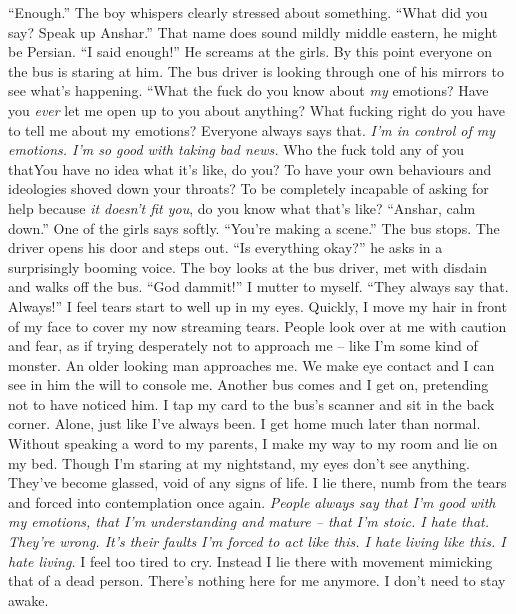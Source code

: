 \documentclass[a4paper, 12pt]{book}
\newcommand\tab[1][1cm]{\hspace*{#1}}
\begin{document}
\newline
\tab
``Enough.'' The boy whispers clearly stressed about something.
\newline
\tab
``What did you say? Speak up Anshar.'' That name does sound mildly middle eastern, he might be Persian.
\newline
\tab
``I said enough!'' He screams at the girls. By this point everyone on the bus is staring at him. The bus driver is looking through one of his mirrors to see what’s happening. ``What the fuck do you know about \textit{my} emotions? Have you \textit{ever} let me open up to you about anything? What fucking right do you have to tell me about my emotions? Everyone always says that. \textit{I’m in control of my emotions. I’m so good with taking bad news.} Who the fuck told any of you that\textinterrobang You have no idea what it’s like, do you? To have your own behaviours and ideologies shoved down your throats? To be completely incapable of asking for help because \textit{it doesn’t fit you}, do you know what that’s like?
\newline
\tab
``Anshar, calm down.'' One of the girls says softly. ``You’re making a scene.''
\newline
\tab
The bus stops. The driver opens his door and steps out. ``Is everything okay?'' he asks in a surprisingly booming voice. The boy looks at the bus driver, met with disdain and walks off the bus.
\newline
\newline
\tab
``God dammit!'' I mutter to myself. ``They always say that. Always!'' I feel tears start to well up in my eyes. Quickly, I move my hair in front of my face to cover my now streaming tears. People look over at me with caution and fear, as if trying desperately not to approach me -- like I’m some kind of monster.
An older looking man approaches me. We make eye contact and I can see in him the will to console me. Another bus comes and I get on, pretending not to have noticed him. I tap my card to the bus’s scanner and sit in the back corner. Alone, just like I’ve always been.
\newline
\tab
I get home much later than normal. Without speaking a word to my parents, I make my way to my room and lie on my bed. Though I’m staring at my nightstand, my eyes don’t see anything. They’ve become glassed, void of any signs of life. I lie there, numb from the tears and forced into contemplation once again.
\newline
\tab
\textit{People always say that I’m good with my emotions, that I’m understanding and mature -- that I’m stoic. I hate that. They’re wrong. It’s their faults I’m forced to act like this. I hate living like this. I hate living.} I feel too tired to cry. Instead I lie there with movement mimicking that of a dead person. There’s nothing here for me anymore. I don’t need to stay awake.
\end{document}
